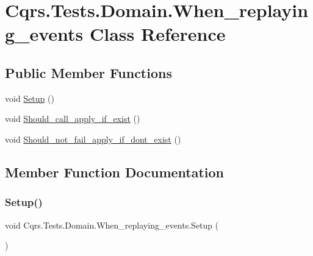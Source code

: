 \hypertarget{classCqrs_1_1Tests_1_1Domain_1_1When__replaying__events}{}\section{Cqrs.\+Tests.\+Domain.\+When\+\_\+replaying\+\_\+events Class Reference}
\label{classCqrs_1_1Tests_1_1Domain_1_1When__replaying__events}
\subsection*{Public Member Functions}
\begin{DoxyCompactItemize}
\item 
void \hyperlink{classCqrs_1_1Tests_1_1Domain_1_1When__replaying__events_a83a76fd0ac92c405028a0a0d744d73a0_a83a76fd0ac92c405028a0a0d744d73a0}{Setup} ()
\item 
void \hyperlink{classCqrs_1_1Tests_1_1Domain_1_1When__replaying__events_a630778a73adf7e08123d354729d73e8e_a630778a73adf7e08123d354729d73e8e}{Should\+\_\+call\+\_\+apply\+\_\+if\+\_\+exist} ()
\item 
void \hyperlink{classCqrs_1_1Tests_1_1Domain_1_1When__replaying__events_a3709b0c411566da58817a0bdbb70099a_a3709b0c411566da58817a0bdbb70099a}{Should\+\_\+not\+\_\+fail\+\_\+apply\+\_\+if\+\_\+dont\+\_\+exist} ()
\end{DoxyCompactItemize}


\subsection{Member Function Documentation}
\mbox{\label{classCqrs_1_1Tests_1_1Domain_1_1When__replaying__events_a83a76fd0ac92c405028a0a0d744d73a0_a83a76fd0ac92c405028a0a0d744d73a0}} 
\subsubsection{\texorpdfstring{Setup()}{Setup()}}
{\footnotesize\ttfamily void Cqrs.\+Tests.\+Domain.\+When\+\_\+replaying\+\_\+events.\+Setup (\begin{DoxyParamCaption}{ }\end{DoxyParamCaption})}

